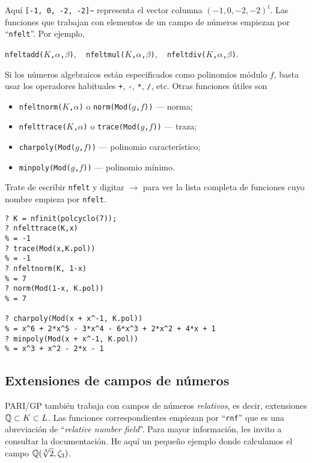 Aquí \texttt{[-1, 0, -2, -2]\textasciitilde} representa el vector columna
$(-1,0,-2,-2)^t$. Las funciones que trabajan con elementos de un campo de
números empiezan por ``\texttt{nfelt}''. Por ejemplo,
\begin{center}
\texttt{nfeltadd($K$,$\alpha$,$\beta$)}, ~
\texttt{nfeltmul($K$,$\alpha$,$\beta$)}, ~
\texttt{nfeltdiv($K$,$\alpha$,$\beta$)}.
\end{center}
Si los números algebraicos están especificados como polinomios módulo $f$, basta
usar los operadores habituales \texttt{+}, \texttt{-}, \texttt{*}, \texttt{/},
etc. Otras funciones útiles son
\begin{itemize}
\item \texttt{nfeltnorm($K$,$\alpha$)} o \texttt{norm(Mod($g$,$f$))} --- norma;
\item \texttt{nfelttrace($K$,$\alpha$)} o \texttt{trace(Mod($g$,$f$))} --- traza;
\item \texttt{charpoly(Mod($g$,$f$))} --- polinomio característico;
\item \texttt{minpoly(Mod($g$,$f$))} --- polinomio mínimo.
\end{itemize}
Trate de escribir \texttt{nfelt} y digitar $\boxed{\to}$ para ver la lista
completa de funciones cuyo nombre empieza por \texttt{nfelt}.

\begin{shaded}
\begin{verbatim}
? K = nfinit(polcyclo(7));
? nfelttrace(K,x)
% = -1
? trace(Mod(x,K.pol))
% = -1
? nfeltnorm(K, 1-x)
% = 7
? norm(Mod(1-x, K.pol))
% = 7

? charpoly(Mod(x + x^-1, K.pol))
% = x^6 + 2*x^5 - 3*x^4 - 6*x^3 + 2*x^2 + 4*x + 1
? minpoly(Mod(x + x^-1, K.pol))
% = x^3 + x^2 - 2*x - 1
\end{verbatim}
\end{shaded}

\subsection{Extensiones de campos de números}

PARI/GP también trabaja con campos de números \emph{relativos}, es decir,
extensiones $\mathbb{Q} \subset K \subset L$. Las funciones correspondientes empiezan
por ``\texttt{rnf}'' que es una abreviación de ``\emph{relative number field}''.
Para mayor información, les invito a consultar la documentación. He aquí un
pequeño ejemplo donde calculamos el campo $\mathbb{Q} (\sqrt[3]{2},\zeta_3)$.

